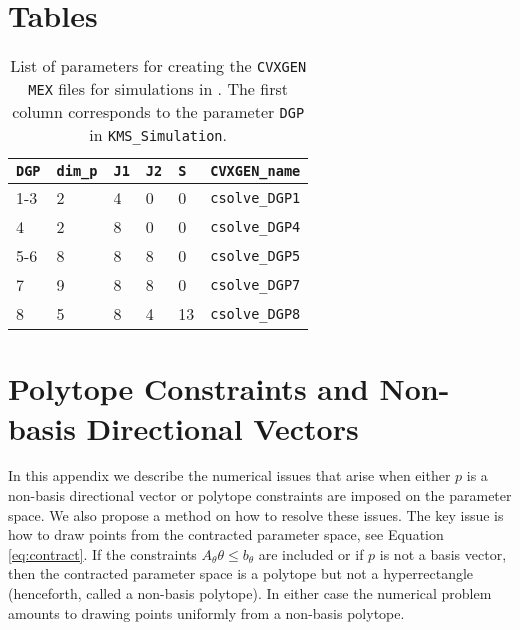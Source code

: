 \documentclass[12pt]{article}
\def\code#1{\texttt{#1}}
\begin{document}

\begin{flushleft}

\end{flushleft}

\clearpage

\begin{appendices}

\section{Tables} \label{sec:tab}

\begin{table}[h!]
\centering
\begin{tabular}{llllll}
\hline
\code{DGP} & \code{dim\_p} & \code{J1} & \code{J2} & \code{S} & \code{CVXGEN\_name} \\ \hline
1-3          & 2               & 4           & 0           & 0          & \code{csolve\_DGP1} \\
4            & 2               & 8           & 0           & 0          & \code{csolve\_DGP4} \\
5-6          & 8               & 8           & 8           & 0          & \code{csolve\_DGP5} \\
7            & 9               & 8           & 8           & 0          & \code{csolve\_DGP7} \\
8            & 5               & 8           & 4           & 13         & \code{csolve\_DGP8} \\ \hline
\end{tabular}
\caption{List of parameters for creating the \code{CVXGEN MEX} files for simulations in \protect{}.  The first column corresponds to the parameter \code{DGP} in \code{KMS\_Simulation}.}
\label{tab:cvxgenparams}
\end{table}



\section{Polytope Constraints and Non-basis Directional Vectors} \label{appendix:polytope}
In this appendix we describe the numerical issues that arise when either $p$ is a non-basis directional vector or polytope constraints are imposed on the parameter space. We also propose a method on how to resolve these issues.  The key issue is how to draw points from the contracted parameter space, see Equation \eqref{eq:contract}. If the constraints $A_{\theta} \theta \leq b_{\theta}$ are included or if  $p$ is not a basis vector, then the contracted parameter space is a polytope but not a hyperrectangle (henceforth, called a non-basis polytope).   In either case the numerical problem amounts to drawing points uniformly from a non-basis polytope.


\end{appendices}
\end{document}
